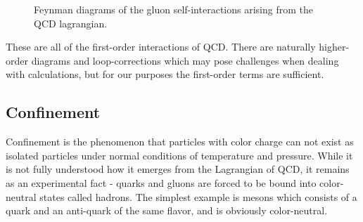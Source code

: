 \documentclass[main.tex]{subfiles}
\begin{document}
\begin{figure}[htb]
    \centering
    \begin{minipage}{.35\textwidth}
    \centering
\end{minipage}%
\begin{minipage}{.35\textwidth}
    \centering
\end{minipage}
\caption{Feynman diagrams of the gluon self-interactions arising from the QCD lagrangian.}
\label{fig: feynman_gluon_interactions}
\end{figure}

These are all of the first-order interactions of QCD. There are naturally higher-order diagrams and loop-corrections which may pose challenges when dealing with calculations, but for our purposes the first-order terms are sufficient. 

\subsection{Confinement}
Confinement is the phenomenon that particles with color charge can not exist as isolated particles under normal conditions of temperature and pressure. While it is not fully understood how it emerges from the Lagrangian of QCD, it remains as an experimental fact - quarks and gluons are forced to be bound into color-neutral states called hadrons. The simplest example is mesons which consists of a quark and an anti-quark of the same flavor, and is obviously color-neutral. 
\end{document}
